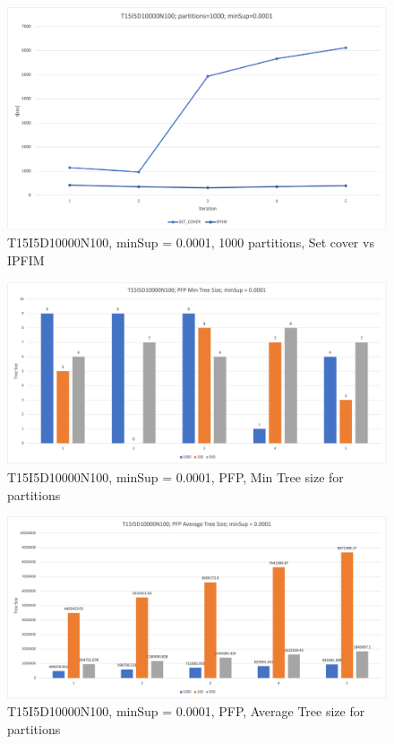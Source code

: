\begin{figure}
  \centering
  \includegraphics[width=\linewidth]{figures/4iterations/T15I5D10000N100_1000part_SETCOVER_0001}
  \caption{T15I5D10000N100, minSup = 0.0001,  1000 partitions, Set cover vs IPFIM}
  \label{fig:T15I5D10000N100_1000part_SETCOVER_0001}
\end{figure}



\begin{figure}
  \centering
  \includegraphics[width=\linewidth]{figures/4iterations/T15I5D10000N100_MinTree_PFP_0001}
  \caption{T15I5D10000N100, minSup = 0.0001,  PFP, Min Tree size for partitions}
  \label{fig:T15I5D10000N100_MinTree_PFP_0001}
\end{figure}

\begin{figure}
  \centering
  \includegraphics[width=\linewidth]{figures/4iterations/T15I5D10000N100_AvgTree_PFP_0001}
  \caption{T15I5D10000N100, minSup = 0.0001,  PFP, Average Tree size for partitions}
  \label{fig:T15I5D10000N100_AvgTree_PFP_0001}
\end{figure}

